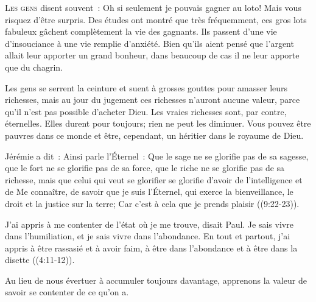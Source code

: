 \lettrine{L}{es gens} disent souvent~: 
 \Og Oh si seulement je pouvais gagner au loto! \Fg{}
 Mais vous risquez d'être surpris. Des études ont montré
 que très fréquemment, ces gros lots fabuleux gâchent complètement
 la vie des gagnants. Ils passent d'une vie d'insouciance
 à une vie remplie d'anxiété. Bien qu'ils aient pensé
 que l'argent allait leur apporter un grand bonheur,
 dans beaucoup de cas il ne leur apporte que du chagrin.

Les gens se serrent la ceinture et suent à grosses gouttes
 pour amasser leurs richesses, mais au jour du jugement
 ces richesses n'auront aucune valeur, parce qu'il n'est pas possible
 d'acheter Dieu. Les vraies richesses sont, par contre, éternelles.
 Elles durent pour toujours; rien ne peut les diminuer.
 Vous pouvez être pauvres dans ce monde et être, cependant,
 un héritier dans le royaume de Dieu.


Jérémie a dit~: 
 \Og Ainsi parle l'Éternel~: Que le sage ne se glorifie pas de sa sagesse,
 que le fort ne se glorifie pas de sa force, que le riche ne se glorifie pas
 de sa richesse, mais que celui qui veut se glorifier se glorifie d'avoir
 de l'intelligence et de Me connaître, de savoir que je suis l'Éternel,
 qui exerce la bienveillance, le droit et la justice sur la terre;
 Car c'est à cela que je prends plaisir \Fg{} 
 ((9:22-23)).

\Og J'ai appris à me contenter de l'état où je me trouve, disait Paul.
 Je sais vivre dans l'humiliation, et je sais vivre dans l'abondance.
 En tout et partout, j'ai appris à être rassasié et à avoir faim,
 à être dans l'abondance et à être dans la disette \Fg{} 
 ((4:11-12)).

Au lieu de nous évertuer à accumuler toujours davantage, apprenons la valeur
 de savoir se contenter de ce qu'on a. 

\dvrule







